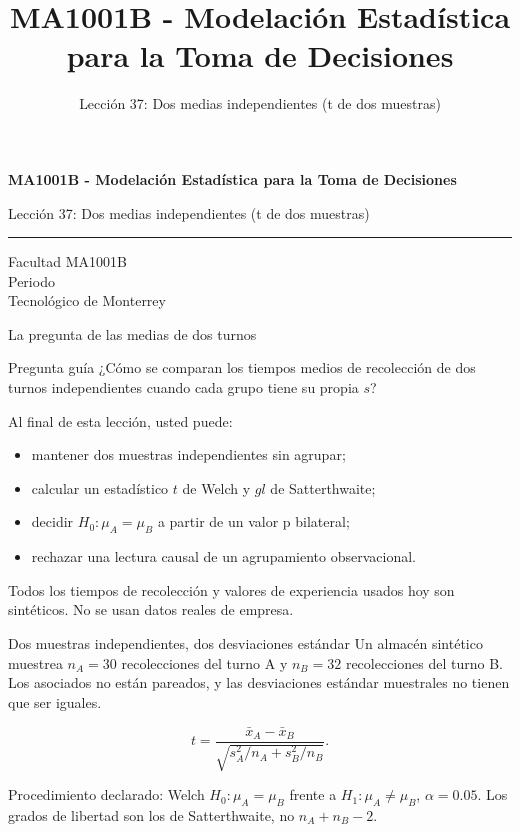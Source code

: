 \documentclass[aspectratio=169,10pt,spanish]{beamer}
\title{MA1001B - Modelación Estadística para la Toma de Decisiones}
\subtitle{Lección 37: Dos medias independientes (t de dos muestras)}
\author{}
\institute{Tecnol\'ogico de Monterrey}
\date{}
\begin{document}
\begin{frame}[plain]
  \vspace{1.2cm}
  {\Large\bfseries MA1001B - Modelación Estadística para la Toma de Decisiones\par}
  \vspace{0.7cm}
  {\large Lección 37: Dos medias independientes (t de dos muestras)\par}
  \vspace{0.7cm}
  {\color{TecRojo}\rule{\textwidth}{1.2pt}}
  \vspace{0.8cm}

  Facultad MA1001B\\[0.3cm]
  Periodo\\[0.3cm]
  Tecnol\'ogico de Monterrey
\end{frame}

\begin{frame}{La pregunta de las medias de dos turnos}
  \begin{alertblock}{Pregunta guía}
    ¿Cómo se comparan los tiempos medios de recolección de dos turnos
    independientes cuando cada grupo tiene su propia $s$?
  \end{alertblock}

  \vspace{0.6em}
  Al final de esta lección, usted puede:
  \begin{itemize}
    \item mantener dos muestras independientes sin agrupar;
    \item calcular un estadístico $t$ de Welch y $gl$ de Satterthwaite;
    \item decidir $H_0:\mu_A=\mu_B$ a partir de un valor p bilateral;
    \item rechazar una lectura causal de un agrupamiento observacional.
  \end{itemize}

  \vfill
  \scriptsize Todos los tiempos de recolección y valores de experiencia usados hoy son sintéticos. No se usan datos reales de empresa.
\end{frame}

\begin{frame}{Dos muestras independientes, dos desviaciones estándar}
  \small
  Un almacén sintético muestrea $n_A=30$ recolecciones del turno A y
  $n_B=32$ recolecciones del turno B. Los asociados no están pareados, y las
  desviaciones estándar muestrales no tienen que ser iguales.

  \[
    t=\frac{\bar{x}_A-\bar{x}_B}{\sqrt{s_A^2/n_A+s_B^2/n_B}}.
  \]

  \begin{exampleblock}{Procedimiento declarado: Welch}
    $H_0:\mu_A=\mu_B$ frente a $H_1:\mu_A\neq\mu_B$, $\alpha=0.05$. Los
    grados de libertad son los de Satterthwaite, no $n_A+n_B-2$.
  \end{exampleblock}
\end{frame}
\end{document}
